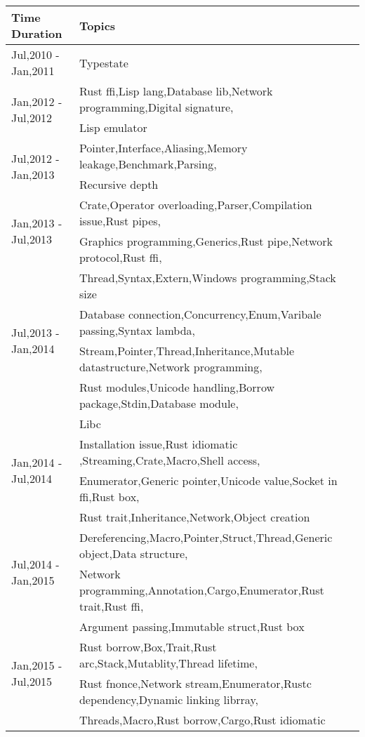 \begin{table}[]
\begin{tabular}{|l|l|}
\hline
Time Duration & Topics \\ \hline
\multirow{1}{*}{Jul,2010 - Jan,2011} & Typestate\\ \hline
\multirow{2}{*}{Jan,2012 - Jul,2012} & Rust ffi,Lisp lang,Database lib,Network programming,Digital signature,\\ & Lisp emulator\\ \hline
\multirow{2}{*}{Jul,2012 - Jan,2013} & Pointer,Interface,Aliasing,Memory leakage,Benchmark,Parsing,\\ & Recursive depth\\ \hline
\multirow{2}{*}{Jan,2013 - Jul,2013} & Crate,Operator overloading,Parser,Compilation issue,Rust pipes,\\ & Graphics programming,Generics,Rust pipe,Network protocol,Rust ffi,\\ & Thread,Syntax,Extern,Windows programming,Stack size\\ \hline
\multirow{2}{*}{Jul,2013 - Jan,2014} & Database connection,Concurrency,Enum,Varibale passing,Syntax lambda,\\ & Stream,Pointer,Thread,Inheritance,Mutable datastructure,Network programming,\\ & Rust modules,Unicode handling,Borrow package,Stdin,Database module,\\ & Libc\\ \hline
\multirow{2}{*}{Jan,2014 - Jul,2014} & Installation issue,Rust idiomatic ,Streaming,Crate,Macro,Shell access,\\ & Enumerator,Generic pointer,Unicode value,Socket in ffi,Rust box,\\ & Rust trait,Inheritance,Network,Object creation\\ \hline
\multirow{2}{*}{Jul,2014 - Jan,2015} & Dereferencing,Macro,Pointer,Struct,Thread,Generic object,Data structure,\\ & Network programming,Annotation,Cargo,Enumerator,Rust trait,Rust ffi,\\ & Argument passing,Immutable struct,Rust box\\ \hline
\multirow{2}{*}{Jan,2015 - Jul,2015} & Rust borrow,Box,Trait,Rust arc,Stack,Mutablity,Thread lifetime,\\ & Rust fnonce,Network stream,Enumerator,Rustc dependency,Dynamic linking librray,\\ & Threads,Macro,Rust borrow,Cargo,Rust idiomatic\\ \hline

\end{tabular}
\end{table}
